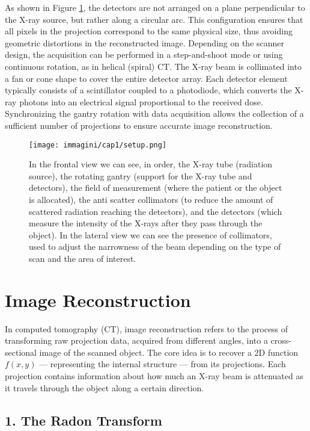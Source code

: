 As shown in Figure \ref{fig:CT_detector}, the detectors are not arranged on a plane perpendicular to the X-ray source, but rather along a circular arc. This configuration ensures that all pixels in the projection correspond to the same physical size, thus avoiding geometric distortions in the reconstructed image.
Depending on the scanner design, the acquisition can be performed in a step-and-shoot mode or using continuous rotation, as in helical (spiral) CT. The X-ray beam is collimated into a fan or cone shape to cover the entire detector array. Each detector element typically consists of a scintillator coupled to a photodiode, which converts the X-ray photons into an electrical signal proportional to the received dose. Synchronizing the gantry rotation with data acquisition allows the collection of a sufficient number of projections to ensure accurate image reconstruction.
\begin{figure}[!ht]
    \centering
    \texttt{[image: immagini/cap1/setup.png]} 
    \caption{In the frontal view we can see, in order, the X-ray tube (radiation source), the rotating gantry (support for the X-ray tube and detectors), the field of measurement (where the patient or the object is allocated), the anti scatter collimators (to reduce the amount of scattered radiation reaching the detectors), and the detectors (which measure the intensity of the X-rays after they pass through the object). In the lateral view we can see the presence of collimators, used to adjust the narrowness of the beam depending on the type of scan and the area of interest.} 
    \label{fig:CT_detector}
\end{figure}
\FloatBarrier 

\section{Image Reconstruction}

In computed tomography (CT), image reconstruction refers to the process of transforming raw projection data, acquired from different angles, into a cross-sectional image of the scanned object. The core idea is to recover a 2D function \( f(x, y) \) — representing the internal structure — from its projections. Each projection contains information about how much an X-ray beam is attenuated as it travels through the object along a certain direction.

\subsection*{1. The Radon Transform}

